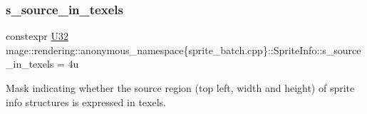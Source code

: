 \subsubsection{\texorpdfstring{s\+\_\+source\+\_\+in\+\_\+texels}{s\_source\_in\_texels}}
{\footnotesize\ttfamily constexpr \mbox{\hyperlink{namespacemage_aa5d6eaabaac3cdd01873d6a3d27e90f3}{U32}} mage\+::rendering\+::anonymous\+\_\+namespace\{sprite\+\_\+batch.\+cpp\}\+::Sprite\+Info\+::s\+\_\+source\+\_\+in\+\_\+texels = 4u\hspace{0.3cm}{\ttfamily [static]}}

Mask indicating whether the source region (top left, width and height) of sprite info structures is expressed in texels. 